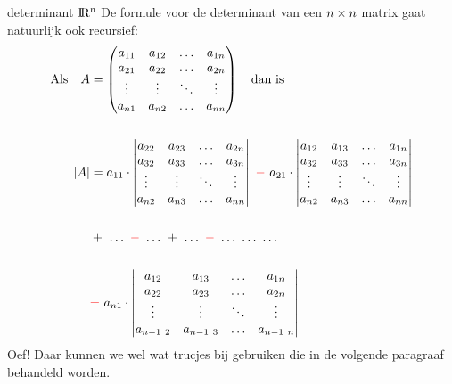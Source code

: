 \newpage
\mydef
{determinant  ${\rm I\!R^{n}}$}
{De formule voor de determinant van een $n\ {\mkern-2mu\times\mkern-2mu}\ n$ matrix gaat natuurlijk ook recursief:   
\begin{align*}
	\text{Als} \quad A  &= 
	\begin{pmatrix}
	   a_{11} &  a_{12}  & \ldots & a_{1n}\\
	   a_{21}  &  a_{22} & \ldots & a_{2n}\\
	   \vdots & \vdots & \ddots & \vdots\\
	   a_{n1}  &   a_{n2}       &\ldots & a_{nn}
	\end{pmatrix} 	 \quad  \text{dan is} \\ \\
	|A| &= a_{11} \cdot    	 
	\begin{vmatrix}
	   a_{22}  &  a_{23} & \ldots & a_{2n}\\
	   a_{32}  &  a_{33} & \ldots & a_{3n}\\
	   \vdots & \vdots & \ddots & \vdots\\
	   a_{n2}  &   a_{n3}       &\ldots & a_{nn}
	\end{vmatrix} 
	\ \red{-}  \ a_{21} \cdot  	
	\begin{vmatrix}
	   a_{12} &  a_{13}  & \ldots & a_{1n}\\
	   a_{32}  &  a_{33} & \ldots & a_{3n}\\
	   \vdots & \vdots & \ddots & \vdots\\
	   a_{n2}  &   a_{n3}       &\ldots & a_{nn}
	\end{vmatrix} \\ \\
	& +\ \dots\ \red{-}\ \dots\ +\ \dots\ \red{-}\  \dots\ \dots\ \dots\\ \\
	&\red {\pm \ } a_{n1} \cdot    
	\begin{vmatrix}
	   a_{12} &  a_{13}  & \ldots & a_{1n}\\
	   a_{22}  &  a_{23} & \ldots & a_{2n}\\
	   \vdots & \vdots & \ddots & \vdots\\
	   a_{n-1 \ 2}  &   a_{n-1 \ 3}       &\ldots & a_{n-1 \ n}
	\end{vmatrix} 
\end{align*}
}
Oef! Daar kunnen we wel wat trucjes bij gebruiken die in de volgende paragraaf behandeld worden.
